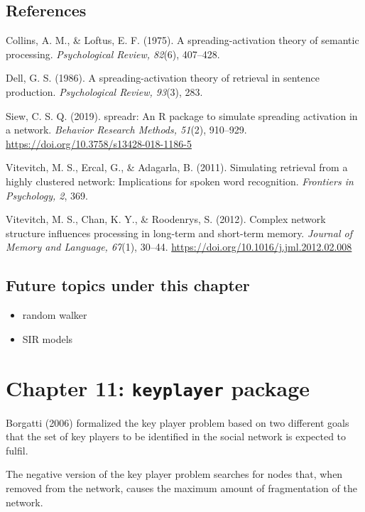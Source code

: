 \documentclass[
]{book}
\providecommand{\tightlist}{%
  \setlength{\itemsep}{0pt}\setlength{\parskip}{0pt}}
\begin{document}
\section{References}\label{references}

Collins, A. M., \& Loftus, E. F. (1975). A spreading-activation theory of semantic processing. \emph{Psychological Review, 82}(6), 407--428.

Dell, G. S. (1986). A spreading-activation theory of retrieval in sentence production. \emph{Psychological Review, 93}(3), 283.

Siew, C. S. Q. (2019). spreadr: An R package to simulate spreading activation in a network. \emph{Behavior Research Methods, 51}(2), 910--929. \url{https://doi.org/10.3758/s13428-018-1186-5}

Vitevitch, M. S., Ercal, G., \& Adagarla, B. (2011). Simulating retrieval from a highly clustered network: Implications for spoken word recognition. \emph{Frontiers in Psychology, 2}, 369.

Vitevitch, M. S., Chan, K. Y., \& Roodenrys, S. (2012). Complex network structure influences processing in long-term and short-term memory. \emph{Journal of Memory and Language, 67}(1), 30--44. \url{https://doi.org/10.1016/j.jml.2012.02.008}

\section{Future topics under this chapter}\label{future-topics-under-this-chapter}

\begin{itemize}
\tightlist
\item
  random walker
\item
  SIR models
\end{itemize}

\chapter{\texorpdfstring{Chapter 11: \texttt{keyplayer} package}{Chapter 11: keyplayer package}}\label{ch11}

Borgatti (2006) formalized the key player problem based on two different goals that the set of key players to be identified in the social network is expected to fulfil.

The negative version of the key player problem searches for nodes that, when removed from the network, causes the maximum amount of fragmentation of the network.
\end{document}
